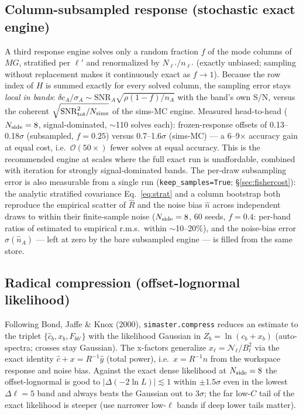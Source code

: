 \subsection{Column-subsampled response (stochastic exact engine)}
A third response engine solves only a random fraction $f$ of the mode columns of $MG$, stratified per $\ell'$ and renormalized by $N_{\ell'}/n_{\ell'}$ (exactly unbiased; sampling without replacement makes it continuously exact as $f\to1$).  Because the row index of $H$ is summed exactly for every solved column, the sampling error stays \emph{local in bands}: $\delta c_A/\sigma_A \sim \mathrm{SNR}_A\sqrt{\rho(1-f)/n_A}$ with the band's own S/N, versus the coherent $\sqrt{\mathrm{SNR}^2_{\rm tot}/N_{\rm sims}}$ of the sims-MC engine.  Measured head-to-head ($N_{\rm side}=8$, signal-dominated, $\sim$110 solves each): frozen-response offsets of 0.13--0.18$\sigma$ (subsampled, $f=0.25$) versus 0.7--1.6$\sigma$ (sims-MC) --- a 6--9$\times$ accuracy gain at equal cost, i.e.\ $\mathcal{O}(50\times)$ fewer solves at equal accuracy.  This is the recommended engine at scales where the full exact run is unaffordable, combined with iteration for strongly signal-dominated bands.  The per-draw subsampling error is also measurable from a single run (\texttt{keep\_samples=True}; \S\ref{sec:fishercost}): the analytic stratified covariance Eq.~\eqref{eq:strat} and a column bootstrap both reproduce the empirical scatter of $\hat R$ and the noise bias $\hat n$ across independent draws to within their finite-sample noise ($N_{\rm side}=8$, 60 seeds, $f=0.4$: per-band ratios of estimated to empirical r.m.s.\ within $\sim$10--20\%), and the noise-bias error $\sigma(\hat n_A)$ --- left at zero by the bare subsampled engine --- is filled from the same store.

\subsection{Radical compression (offset-lognormal likelihood)}
Following Bond, Jaffe \& Knox (2000), \texttt{simaster.compress} reduces an estimate to the triplet $\{\hat c_b, x_b, F_{bb'}\}$ with the likelihood Gaussian in $Z_b=\ln(c_b+x_b)$ (auto-spectra; crosses stay Gaussian).  The x-factors generalize $x_\ell=\mathcal N_\ell/B_\ell^2$ via the exact identity $\hat c + x = R^{-1}\hat y$ (total power), i.e.\ $x=R^{-1}n$ from the workspace response and noise bias.  Against the exact dense likelihood at $N_{\rm side}=8$ the offset-lognormal is good to $|\Delta(-2\ln L)|\lesssim1$ within $\pm1.5\sigma$ even in the lowest $\Delta\ell=5$ band and always beats the Gaussian out to $3\sigma$; the far low-$C$ tail of the exact likelihood is steeper (use narrower low-$\ell$ bands if deep lower tails matter).

